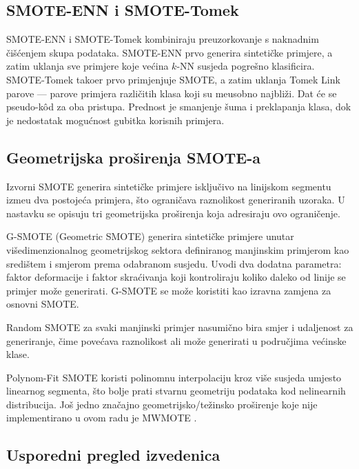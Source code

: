\subsection{SMOTE-ENN i SMOTE-Tomek}

SMOTE-ENN i SMOTE-Tomek \cite{batista2004} kombiniraju preuzorkovanje s
naknadnim \v{c}i\v{s}\'{c}enjem skupa podataka. SMOTE-ENN prvo generira
sinteti\v{c}ke primjere, a zatim uklanja sve primjere koje ve\'{c}ina
$k$-NN susjeda pogre\v{s}no klasificira. SMOTE-Tomek tako\dj{}er prvo
primjenjuje SMOTE, a zatim uklanja Tomek Link parove --- parove primjera
razli\v{c}itih klasa koji su me\dj{}usobno najbli\v{z}i. Dat \'{c}e se
pseudo-k\^{o}d za oba pristupa. Prednost je smanjenje \v{s}uma i
preklapanja klasa, dok je nedostatak mogu\'{c}nost gubitka korisnih
primjera.

\subsection{Geometrijska pro\v{s}irenja SMOTE-a}

Izvorni SMOTE generira sinteti\v{c}ke primjere isklju\v{c}ivo na linijskom
segmentu izme\dj{}u dva postoje\'{c}a primjera, \v{s}to ograni\v{c}ava
raznolikost generiranih uzoraka. U nastavku se opisuju tri geometrijska
pro\v{s}irenja koja adresiraju ovo ograni\v{c}enje.

G-SMOTE (Geometric SMOTE) \cite{douzas2019} generira sinteti\v{c}ke
primjere unutar vi\v{s}edimenzionalnog geometrijskog sektora definiranog
manjinskim primjerom kao sredi\v{s}tem i smjerom prema odabranom susjedu.
Uvodi dva dodatna parametra: faktor deformacije i faktor skra\'{c}ivanja
koji kontroliraju koliko daleko od linije se primjer mo\v{z}e generirati.
G-SMOTE se mo\v{z}e koristiti kao izravna zamjena za osnovni SMOTE.

Random SMOTE \cite{dong2011} za svaki manjinski primjer nasumi\v{c}no bira
smjer i udaljenost za generiranje, \v{c}ime pove\'{c}ava raznolikost ali
mo\v{z}e generirati u podru\v{c}jima ve\'{c}inske klase.

Polynom-Fit SMOTE \cite{gazzah2008} koristi polinomnu interpolaciju kroz
vi\v{s}e susjeda umjesto linearnog segmenta, \v{s}to bolje prati stvarnu
geometriju podataka kod nelinearnih distribucija. Jo\v{s} jedno
zna\v{c}ajno geometrijsko/te\v{z}insko pro\v{s}irenje koje nije
implementirano u ovom radu je MWMOTE \cite{barua2014}.

\subsection{Usporedni pregled izvedenica}

